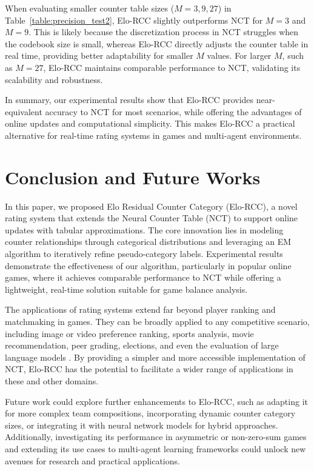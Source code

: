 When evaluating smaller counter table sizes ($M = 3, 9, 27$) in Table~\ref{table:precision_test2}, Elo-RCC slightly outperforms NCT for $M = 3$ and $M = 9$. This is likely because the discretization process in NCT struggles when the codebook size is small, whereas Elo-RCC directly adjusts the counter table in real time, providing better adaptability for smaller $M$ values. For larger $M$, such as $M = 27$, Elo-RCC maintains comparable performance to NCT, validating its scalability and robustness.

In summary, our experimental results show that Elo-RCC provides near-equivalent accuracy to NCT for most scenarios, while offering the advantages of online updates and computational simplicity. This makes Elo-RCC a practical alternative for real-time rating systems in games and multi-agent environments.

\section{Conclusion and Future Works}

In this paper, we proposed Elo Residual Counter Category (Elo-RCC), a novel rating system that extends the Neural Counter Table (NCT) to support online updates with tabular approximations. The core innovation lies in modeling counter relationships through categorical distributions and leveraging an EM algorithm to iteratively refine pseudo-category labels. Experimental results demonstrate the effectiveness of our algorithm, particularly in popular online games, where it achieves comparable performance to NCT while offering a lightweight, real-time solution suitable for game balance analysis.

The applications of rating systems extend far beyond player ranking and matchmaking in games. They can be broadly applied to any competitive scenario, including image or video preference ranking, sports analysis, movie recommendation, peer grading, elections, and even the evaluation of large language models \citep{beauty_score, nd_ability, chatbot_arena}. By providing a simpler and more accessible implementation of NCT, Elo-RCC has the potential to facilitate a wider range of applications in these and other domains.

Future work could explore further enhancements to Elo-RCC, such as adapting it for more complex team compositions, incorporating dynamic counter category sizes, or integrating it with neural network models for hybrid approaches. Additionally, investigating its performance in asymmetric or non-zero-sum games and extending its use cases to multi-agent learning frameworks could unlock new avenues for research and practical applications.

